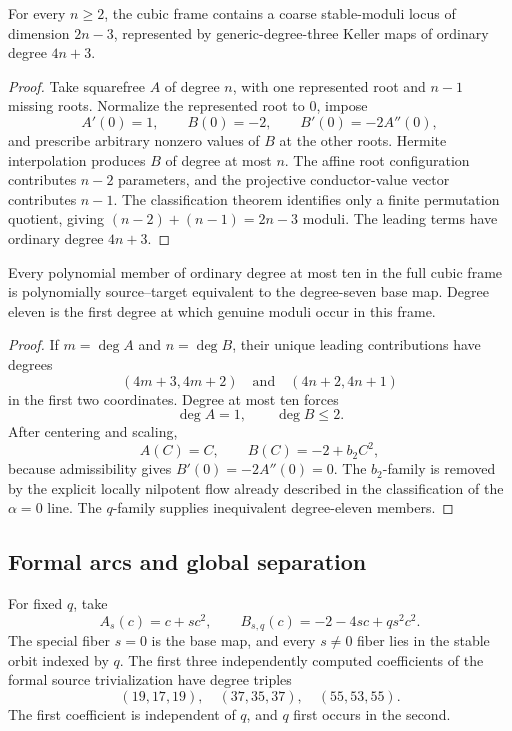 \begin{theorem}
\label{thm:growing-cubic-frame-moduli}
For every \(n\ge2\), the cubic frame contains a coarse stable-moduli locus
of dimension \(2n-3\), represented by generic-degree-three Keller maps of
ordinary degree \(4n+3\).
\end{theorem}

\begin{proof}
Take squarefree \(A\) of degree \(n\), with one represented root and
\(n-1\) missing roots.  Normalize the represented root to \(0\), impose
\[
A'(0)=1,\qquad B(0)=-2,\qquad B'(0)=-2A''(0),
\]
and prescribe arbitrary nonzero values of \(B\) at the other roots.
Hermite interpolation produces \(B\) of degree at most \(n\).
The affine root configuration contributes \(n-2\) parameters, and the
projective conductor-value vector contributes \(n-1\).  The classification
theorem identifies only a finite permutation quotient, giving
\((n-2)+(n-1)=2n-3\) moduli.  The leading terms have ordinary degree
\(4n+3\).
\end{proof}

\begin{theorem}
\label{thm:cubic-frame-degree-threshold}
Every polynomial member of ordinary degree at most ten in the full cubic
frame is polynomially source--target equivalent to the degree-seven base
map.  Degree eleven is the first degree at which genuine moduli occur in
this frame.
\end{theorem}

\begin{proof}
If \(m=\deg A\) and \(n=\deg B\), their unique leading contributions have
degrees
\[
(4m+3,4m+2)\quad\text{and}\quad(4n+2,4n+1)
\]
in the first two coordinates.  Degree at most ten forces
\[
\deg A=1,\qquad\deg B\le2.
\]
After centering and scaling,
\[
A(C)=C,\qquad B(C)=-2+b_2C^2,
\]
because admissibility gives
\(B'(0)=-2A''(0)=0\).  The \(b_2\)-family is removed by the explicit
locally nilpotent flow already described in the classification of the
\(\alpha=0\) line.  The \(q\)-family supplies inequivalent degree-eleven
members.
\end{proof}

\subsection{Formal arcs and global separation}

For fixed \(q\), take
\[
A_s(c)=c+sc^2,\qquad
B_{s,q}(c)=-2-4sc+qs^2c^2.
\]
The special fiber \(s=0\) is the base map, and every \(s\ne0\) fiber lies in
the stable orbit indexed by \(q\).  The first three independently computed
coefficients of the formal source trivialization have degree triples
\[
(19,17,19),\quad(37,35,37),\quad(55,53,55).
\]
The first coefficient is independent of \(q\), and \(q\) first occurs in
the second.


